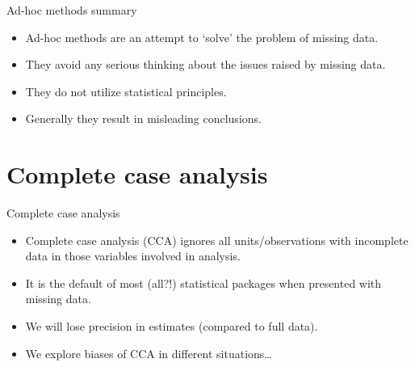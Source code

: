 \documentclass[ignorenonframetext,]{beamer}
\providecommand{\tightlist}{%
  \setlength{\itemsep}{0pt}\setlength{\parskip}{0pt}}
\begin{document}
\begin{frame}{Ad-hoc methods summary}
\protect\hypertarget{ad-hoc-methods-summary}{}

\begin{itemize}
\tightlist
\item
  Ad-hoc methods are an attempt to `solve' the problem of missing data.
\item
  They avoid any serious thinking about the issues raised by missing
  data.
\item
  They do not utilize statistical principles.
\item
  Generally they result in misleading conclusions.
\end{itemize}

\end{frame}

\hypertarget{complete-case-analysis}{%
\section{Complete case analysis}\label{complete-case-analysis}}

\begin{frame}{Complete case analysis}
\protect\hypertarget{complete-case-analysis-1}{}

\begin{itemize}
\tightlist
\item
  Complete case analysis (CCA) ignores all units/observations with
  incomplete data in those variables involved in analysis.
\item
  It is the default of most (all?!) statistical packages when presented
  with missing data.
\item
  We will lose precision in estimates (compared to full data).
\item
  We explore biases of CCA in different situations\ldots{}
\end{itemize}

\end{frame}
\end{document}
